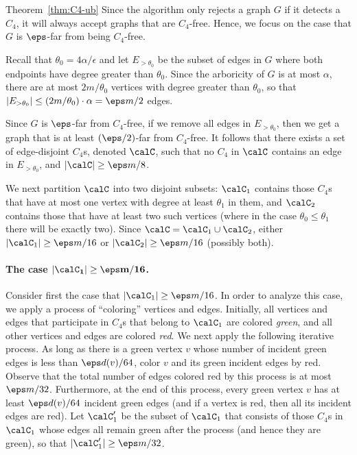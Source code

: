 \begin{proofof}{Theorem~\ref{thm:C4-ub}}
Since the algorithm only rejects a graph $G$ if it detects a $C_4$, it will always accept graphs that are $C_4$-free.
Hence, we focus on  the case that $G$ is $\eps$-far from being $C_4$-free.

Recall that $\theta_0 = 4\alpha/\epsilon$
and let $E_{>\theta_0}$ be the subset of edges in $G$ where both endpoints have degree greater than $\theta_0$. 
Since the arboricity of $G$ is at most $\alpha$,
there are at most $2m/\theta_0$ vertices with degree greater than $\theta_0$, so that $|E_{>\theta_0}| \leq (2m/\theta_0)\cdot \alpha=\eps m/2$ edges.

Since $G$ is $\eps$-far from $C_4$-free, if we remove all edges in $E_{>\theta_0}$, then we get a graph that is at least $(\eps/2)$-far from $C_4$-free. It follows that there exists a set of edge-disjoint $C_4$s, denoted $\calC$, such that
no $C_4$ in $\calC$ contains an edge in $E_{>\theta_0}$, and $|\calC| \geq \eps m/8$.

 We next  partition $\calC$ into two disjoint subsets: $\calC_1$ contains those $C_4$s that have at most one vertex with degree at least $\theta_1$ in them, and $\calC_2$ contains those that have at least two such vertices (where in the case $\theta_0\leq \theta_1$ there will be exactly two).  Since $\calC = \calC_1 \cup \calC_2$, either $|\calC_1| \geq \eps m/16$ or $|\calC_2| \geq \eps m/16$ (possibly both).

\paragraph{The case $\mathbf{|\calC_1| \geq \eps m/16}$.}
Consider first the case that $|\calC_1| \geq \eps m/16$. In order to analyze this case, we apply a process of ``coloring'' vertices and edges. Initially, all vertices and edges that participate in $C_4$s that belong to $\calC_1$ are colored \emph{green}, and all other vertices and edges are colored \emph{red}. We next apply the following iterative process. As long as there is a green vertex $v$ whose number of incident green edges is less than $\eps d(v)/64$, color $v$ and its green incident edges by red. Observe that the total number of edges colored red by this process is at most $\eps m/32$.
Furthermore, at the end of this process, every green vertex $v$ has at least $\eps d(v)/64$ incident green edges (and if a vertex is red, then all its incident edges are red).
Let $\calC_1'$ be the subset of $\calC_1$ that consists of those $C_4$s in $\calC_1$ whose edges all remain green after the process (and hence they are green), so that $|\calC'_1| \geq \eps m/32$.


\end{proofof}
